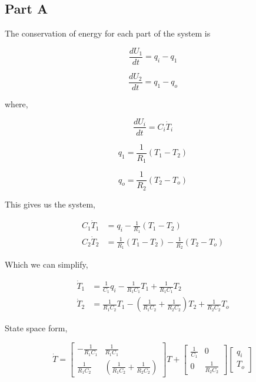 \documentclass[12pt]{article}
\numberwithin{equation}{subsection}
\newcommand\ddfrac[2]{\frac{\displaystyle #1}{\displaystyle #2}}
\begin{document}
  \subsection{Part A}

  The conservation of energy for each part of the system is

  \begin{equation}
    \frac{dU_1}{dt} = q_i - q_1
  \end{equation}

  \begin{equation}
    \frac{dU_2}{dt} = q_1 - q_o
  \end{equation}

  where,

  \begin{equation}
    \frac{dU_i}{dt} = C_i \dot T_i
  \end{equation}

  \begin{equation}
    q_1 = \frac{1}{R_1} (T_1 - T_2)
  \end{equation}

  \begin{equation}
    q_o = \frac{1}{R_2} (T_2 - T_o)
  \end{equation}

  This gives us the system,

  \begin{equation}
    \begin{aligned}
      C_1 \dot T_1 &= q_i - \frac{1}{R_1} (T_1 - T_2) \\
      C_2 \dot T_2 &= \frac{1}{R_1} (T_1 - T_2) - \frac{1}{R_2} (T_2 - T_o)
    \end{aligned}
  \end{equation}

  Which we can simplify,

  \begin{equation}
    \begin{aligned}
      \dot T_1 &= \frac{1}{C_1}q_i - \frac{1}{R_1C_1}T_1 + \frac{1}{R_1C_1}T_2 \\
      \dot T_2 &= \frac{1}{R_1C_2}T_1 - \left( \frac{1}{R_1C_2} + \frac{1}{R_2C_2} \right)T_2 + \frac{1}{R_2C_2}T_o
    \end{aligned}
  \end{equation}

  State space form,

  \begin{equation}
    \dot T =
    \begin{bmatrix}
      - \ddfrac{1}{R_1C_1} & \ddfrac{1}{R_1C_1} \\
      \ddfrac{1}{R_1C_2} & \left( \ddfrac{1}{R_1C_2} + \ddfrac{1}{R_2C_2} \right)
    \end{bmatrix} T +
    \begin{bmatrix}
      \ddfrac{1}{C_1} & 0 \\ 0 & \ddfrac{1}{R_2C_2}
    \end{bmatrix}
    \begin{bmatrix}
      q_i \\ T_o
    \end{bmatrix}
  \end{equation}
\end{document}
